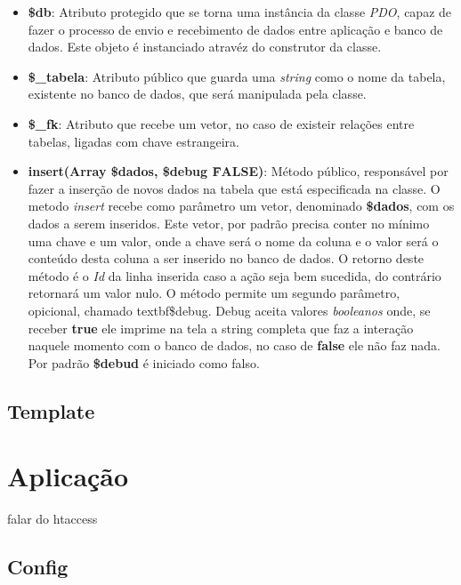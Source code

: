             \begin{itemize}
                \item\textbf{\$db}: Atributo protegido que se torna uma instância da classe \emph{PDO}, capaz de fazer o processo de envio e recebimento de dados entre aplicação e banco de dados. Este objeto é instanciado atravéz do construtor da classe.

                \item\textbf{\$\_tabela}: Atributo público que guarda uma \emph{string} como o nome da tabela, existente no banco de dados, que será manipulada pela classe.

                \item\textbf{\$_fk}: Atributo que recebe um vetor, no caso de existeir relações entre tabelas, ligadas com chave estrangeira.

                \item\textbf{insert(Array \$dados, \$debug \= FALSE)}: Método público, responsável por fazer a inserção de novos dados na tabela que está especificada na classe. O metodo \emph{insert} recebe como parâmetro um vetor, denominado \textbf{\$dados}, com os dados a serem inseridos. Este vetor, por padrão precisa conter no mínimo uma chave e um valor, onde a chave será o nome da coluna e o valor será o conteúdo desta coluna a ser inserido no banco de dados. O retorno deste método é o \emph{Id} da linha inserida caso a ação seja bem sucedida, do contrário retornará um valor nulo. O método permite um segundo parâmetro, opicional, chamado textbf{\$debug}. Debug aceita valores \emph{booleanos} onde, se receber \textbf{true} ele imprime na tela a string completa que faz a interação naquele momento com o banco de dados, no caso de \textbf{false} ele não faz nada. Por padrão \textbf{\$debud} é iniciado como falso.


            \end{itemize}

        \subsection{Template\label{sub:system-template}}


    \section{Aplicação\label{sec:app}}

        falar do htaccess

        \subsection{Config\label{sec:app-config}}

